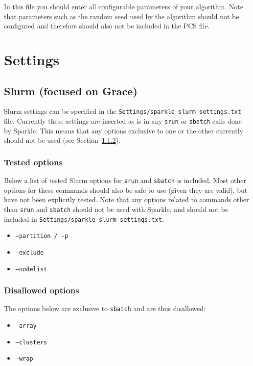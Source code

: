 \documentclass{article}
\begin{document}
In this file you should enter all configurable parameters of your algorithm. Note that parameters such as the random seed used by the algorithm should not be configured and therefore should also not be included in the PCS file.

\section{Settings}

\subsection{Slurm (focused on Grace)}
Slurm settings can be specified in the \texttt{Settings/sparkle\_slurm\_settings.txt} file. Currently these settings are inserted as is in any \texttt{srun} or \texttt{sbatch} calls done by Sparkle. This means that any options exclusive to one or the other currently should not be used (see Section~\ref{slurm:disallowed}).

\subsubsection{Tested options}
Below a list of tested Slurm options for \texttt{srun} and \texttt{sbatch} is included. Most other options for these commands should also be safe to use (given they are valid), but have not been explicitly tested. Note that any options related to commands other than \texttt{srun} and \texttt{sbatch} should not be used with Sparkle, and should not be included in \texttt{Settings/sparkle\_slurm\_settings.txt}.

\begin{itemize}
  \setlength{\itemsep}{0pt}
  \item[] \texttt{--partition / -p}
  \item[] \texttt{--exclude}
  \item[] \texttt{--nodelist}
\end{itemize}

\subsubsection{Disallowed options}
\label{slurm:disallowed}
The options below are exclusive to \texttt{sbatch} and are thus disallowed:

\begin{itemize}
  \setlength{\itemsep}{0pt}
  \item[] \texttt{--array}
  \item[] \texttt{--clusters}
  \item[] \texttt{--wrap}
\end{itemize}
\end{document}
